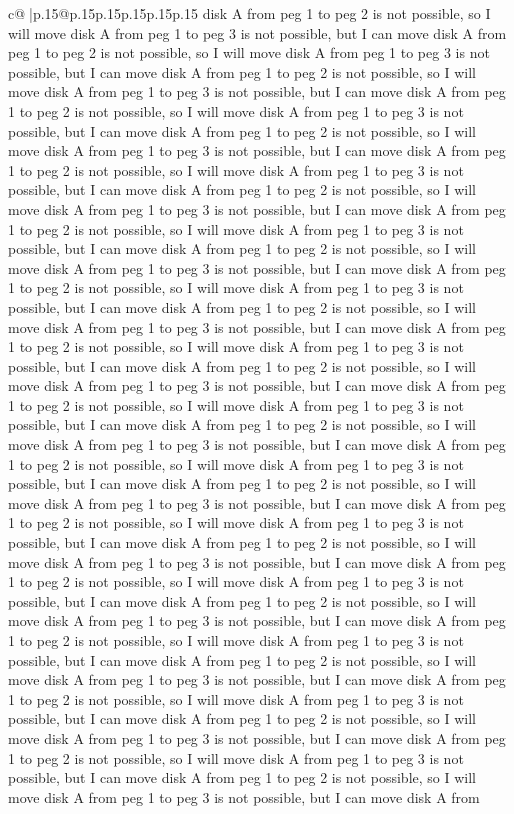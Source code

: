 \documentclass{article}
\begin{document}
{\begin{supertabular}{c@{$\;$}|p{.15\linewidth}@{}p{.15\linewidth}p{.15\linewidth}p{.15\linewidth}p{.15\linewidth}p{.15\linewidth}}
{{{disk A from peg 1 to peg 2 is not possible, so I will move disk A from peg 1 to peg 3 is not possible, but I can move disk A from peg 1 to peg 2 is not possible, so I will move disk A from peg 1 to peg 3 is not possible, but I can move disk A from peg 1 to peg 2 is not possible, so I will move disk A from peg 1 to peg 3 is not possible, but I can move disk A from peg 1 to peg 2 is not possible, so I will move disk A from peg 1 to peg 3 is not possible, but I can move disk A from peg 1 to peg 2 is not possible, so I will move disk A from peg 1 to peg 3 is not possible, but I can move disk A from peg 1 to peg 2 is not possible, so I will move disk A from peg 1 to peg 3 is not possible, but I can move disk A from peg 1 to peg 2 is not possible, so I will move disk A from peg 1 to peg 3 is not possible, but I can move disk A from peg 1 to peg 2 is not possible, so I will move disk A from peg 1 to peg 3 is not possible, but I can move disk A from peg 1 to peg 2 is not possible, so I will move disk A from peg 1 to peg 3 is not possible, but I can move disk A from peg 1 to peg 2 is not possible, so I will move disk A from peg 1 to peg 3 is not possible, but I can move disk A from peg 1 to peg 2 is not possible, so I will move disk A from peg 1 to peg 3 is not possible, but I can move disk A from peg 1 to peg 2 is not possible, so I will move disk A from peg 1 to peg 3 is not possible, but I can move disk A from peg 1 to peg 2 is not possible, so I will move disk A from peg 1 to peg 3 is not possible, but I can move disk A from peg 1 to peg 2 is not possible, so I will move disk A from peg 1 to peg 3 is not possible, but I can move disk A from peg 1 to peg 2 is not possible, so I will move disk A from peg 1 to peg 3 is not possible, but I can move disk A from peg 1 to peg 2 is not possible, so I will move disk A from peg 1 to peg 3 is not possible, but I can move disk A from peg 1 to peg 2 is not possible, so I will move disk A from peg 1 to peg 3 is not possible, but I can move disk A from peg 1 to peg 2 is not possible, so I will move disk A from peg 1 to peg 3 is not possible, but I can move disk A from peg 1 to peg 2 is not possible, so I will move disk A from peg 1 to peg 3 is not possible, but I can move disk A from peg 1 to peg 2 is not possible, so I will move disk A from peg 1 to peg 3 is not possible, but I can move disk A from peg 1 to peg 2 is not possible, so I will move disk A from peg 1 to peg 3 is not possible, but I can move disk A from peg 1 to peg 2 is not possible, so I will move disk A from peg 1 to peg 3 is not possible, but I can move disk A from peg 1 to peg 2 is not possible, so I will move disk A from peg 1 to peg 3 is not possible, but I can move disk A from peg 1 to peg 2 is not possible, so I will move disk A from peg 1 to peg 3 is not possible, but I can move disk A from peg 1 to peg 2 is not possible, so I will move disk A from peg 1 to peg 3 is not possible, but I can move disk A from peg 1 to peg 2 is not possible, so I will move disk A from peg 1 to peg 3 is not possible, but I can move disk A from peg 1 to peg 2 is not possible, so I will move disk A from peg 1 to peg 3 is not possible, but I can move disk A from }}}
\end{supertabular}}
\end{document}
